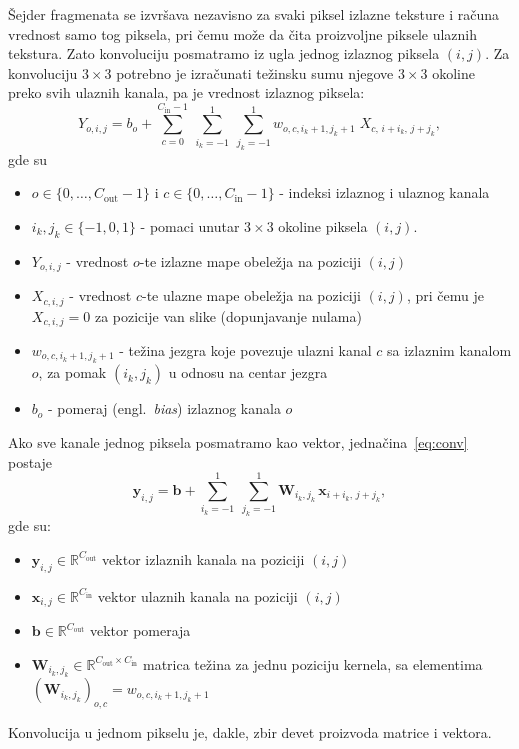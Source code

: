\documentclass[12pt,a4paper]{article}
\begin{document}
Šejder fragmenata se izvršava nezavisno za svaki piksel izlazne teksture i računa vrednost samo tog piksela, pri čemu može da čita proizvoljne piksele ulaznih tekstura. Zato konvoluciju posmatramo iz ugla jednog izlaznog piksela $(i,j)$. Za konvoluciju $3\times3$ potrebno je izračunati težinsku sumu njegove $3\times3$ okoline preko svih ulaznih kanala, pa je vrednost izlaznog piksela:
\begin{equation}
	Y_{o,i,j} = b_o + \sum_{c=0}^{C_\text{in}-1}\ \sum_{i_k=-1}^{1}\ \sum_{j_k=-1}^{1} w_{o,c,i_k+1,j_k+1}\; X_{c,\,i+i_k,\,j+j_k},
	\label{eq:conv}
\end{equation}
gde su
\begin{itemize}[itemsep=0pt, label=$\circ$]
	\item $o \in \{0,\dots,C_\text{out}-1\}$ i $c \in \{0,\dots,C_\text{in}-1\}$ - indeksi izlaznog i ulaznog kanala
	\item $i_k, j_k \in \{-1,0,1\}$ - pomaci unutar $3\times3$ okoline piksela $(i,j)$.
	\item $Y_{o,i,j}$ - vrednost $o$-te izlazne mape obeležja na poziciji $(i,j)$
	\item $X_{c,i,j}$ - vrednost $c$-te ulazne mape obeležja na poziciji $(i,j)$, pri čemu je $X_{c,i,j} = 0$ za pozicije van slike (dopunjavanje nulama)
	\item $w_{o,c,i_k+1,j_k+1}$ - težina jezgra koje povezuje ulazni kanal $c$ sa izlaznim kanalom $o$, za pomak $(i_k,j_k)$ u odnosu na centar jezgra
	\item $b_o$ - pomeraj (engl.~\emph{bias}) izlaznog kanala $o$
\end{itemize}

Ako sve kanale jednog piksela posmatramo kao vektor, jednačina~\eqref{eq:conv} postaje
\begin{equation}
	\mathbf{y}_{i,j} = \mathbf{b} + \sum_{i_k=-1}^{1}\ \sum_{j_k=-1}^{1} \mathbf{W}_{i_k,j_k}\,\mathbf{x}_{i+i_k,\,j+j_k},
	\label{eq:conv-vec}
\end{equation}
gde su:
\begin{itemize}[itemsep=0pt, label=$\circ$]
	\item $\mathbf{y}_{i,j} \in \mathbb{R}^{C_\text{out}}$ vektor izlaznih kanala na poziciji $(i,j)$
	\item $\mathbf{x}_{i,j} \in \mathbb{R}^{C_\text{in}}$ vektor ulaznih kanala na poziciji $(i,j)$
	\item $\mathbf{b} \in \mathbb{R}^{C_\text{out}}$ vektor pomeraja
	\item $\mathbf{W}_{i_k,j_k} \in \mathbb{R}^{C_\text{out} \times C_\text{in}}$ matrica težina za jednu poziciju kernela, sa elementima $(\mathbf{W}_{i_k,j_k})_{o,c} = w_{o,c,i_k+1,j_k+1}$
\end{itemize}
 Konvolucija u jednom pikselu je, dakle, zbir devet proizvoda matrice i vektora.
\end{document}
